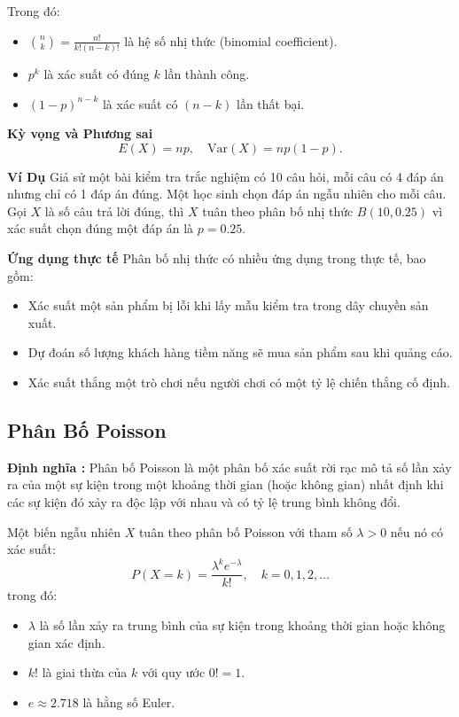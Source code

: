 Trong đó:
\begin{itemize}
    \item $\binom{n}{k} = \frac{n!}{k!(n-k)!}$ là hệ số nhị thức (binomial coefficient).
    \item $p^k$ là xác suất có đúng $k$ lần thành công.
    \item $(1-p)^{n-k}$ là xác suất có $(n-k)$ lần thất bại.
\end{itemize}

\textbf{Kỳ vọng và Phương sai}
\begin{equation}
    E(X) = np, \quad \text{Var}(X) = np(1-p).
\end{equation}

\textbf{Ví Dụ}
Giả sử một bài kiểm tra trắc nghiệm có 10 câu hỏi, mỗi câu có 4 đáp án nhưng chỉ có 1 đáp án đúng. Một học sinh chọn đáp án ngẫu nhiên cho mỗi câu. Gọi $X$ là số câu trả lời đúng, thì $X$ tuân theo phân bố nhị thức $B(10, 0.25)$ vì xác suất chọn đúng một đáp án là $p = 0.25$.

\textbf{Ứng dụng thực tế}
Phân bố nhị thức có nhiều ứng dụng trong thực tế, bao gồm:
\begin{itemize}
    \item Xác suất một sản phẩm bị lỗi khi lấy mẫu kiểm tra trong dây chuyền sản xuất.
    \item Dự đoán số lượng khách hàng tiềm năng sẽ mua sản phẩm sau khi quảng cáo.
    \item Xác suất thắng một trò chơi nếu người chơi có một tỷ lệ chiến thắng cố định.
\end{itemize}



\subsection{Phân Bố Poisson}
\textbf{Định nghĩa : }
Phân bố Poisson là một phân bố xác suất rời rạc mô tả số lần xảy ra của một sự kiện trong một khoảng thời gian (hoặc không gian) nhất định khi các sự kiện đó xảy ra độc lập với nhau và có tỷ lệ trung bình không đổi.

Một biến ngẫu nhiên $X$ tuân theo phân bố Poisson với tham số $\lambda > 0$ nếu nó có xác suất:
\begin{equation}
P(X = k) = \frac{\lambda^k e^{-\lambda}}{k!}, \quad k = 0,1,2,\dots
\end{equation}
trong đó:
\begin{itemize}
    \item $\lambda$ là số lần xảy ra trung bình của sự kiện trong khoảng thời gian hoặc không gian xác định.
    \item $k!$ là giai thừa của $k$ với quy ước $0! = 1$.
    \item $e \approx 2.718$ là hằng số Euler.
\end{itemize}

